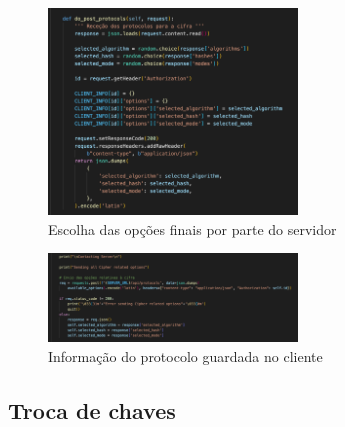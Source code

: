 \documentclass[10pt,english]{article}
\begin{document}
\begin{figure}[!h]
        \centering
        \includegraphics[width=250]{images/cipher_suite_decision_server.png}
        \caption{Escolha das opções finais por parte do servidor}
\end{figure}

\begin{figure}[!h]
        \centering
        \includegraphics[width=250]{images/cipher_suite_save_client.png}
        \caption{Informação do protocolo guardada no cliente}
\end{figure}

\vspace*{3cm}

\subsection{Troca de chaves}
\end{document}
